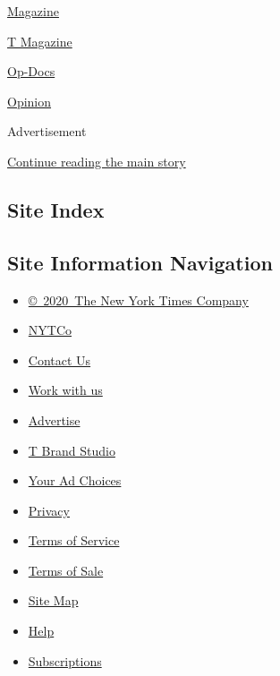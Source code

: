 \href{/video/magazine}{Magazine}

\href{/video/t-magazine}{T Magazine}

\href{/video/op-docs}{Op-Docs}

\href{/video/opinion}{Opinion}

Advertisement

\protect\hyperlink{after-bottom}{Continue reading the main story}

\hypertarget{site-index}{%
\subsection{Site Index}\label{site-index}}

\hypertarget{site-information-navigation}{%
\subsection{Site Information
Navigation}\label{site-information-navigation}}

\begin{itemize}
\tightlist
\item
  \href{https://help.nytimes3xbfgragh.onion/hc/en-us/articles/115014792127-Copyright-notice}{©~2020~The
  New York Times Company}
\end{itemize}

\begin{itemize}
\tightlist
\item
  \href{https://www.nytco.com/}{NYTCo}
\item
  \href{https://help.nytimes3xbfgragh.onion/hc/en-us/articles/115015385887-Contact-Us}{Contact
  Us}
\item
  \href{https://www.nytco.com/careers/}{Work with us}
\item
  \href{https://nytmediakit.com/}{Advertise}
\item
  \href{http://www.tbrandstudio.com/}{T Brand Studio}
\item
  \href{https://www.nytimes3xbfgragh.onion/privacy/cookie-policy\#how-do-i-manage-trackers}{Your
  Ad Choices}
\item
  \href{https://www.nytimes3xbfgragh.onion/privacy}{Privacy}
\item
  \href{https://help.nytimes3xbfgragh.onion/hc/en-us/articles/115014893428-Terms-of-service}{Terms
  of Service}
\item
  \href{https://help.nytimes3xbfgragh.onion/hc/en-us/articles/115014893968-Terms-of-sale}{Terms
  of Sale}
\item
  \href{https://spiderbites.nytimes3xbfgragh.onion}{Site Map}
\item
  \href{https://help.nytimes3xbfgragh.onion/hc/en-us}{Help}
\item
  \href{https://www.nytimes3xbfgragh.onion/subscription?campaignId=37WXW}{Subscriptions}
\end{itemize}
